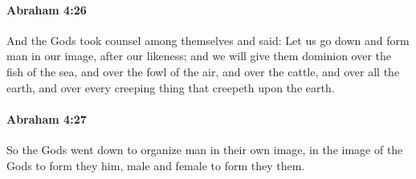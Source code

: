 
		\paragraph{Abraham 4:26} %
			\label{ABRAHAM-4-26}

			And the Gods took counsel among themselves and said: Let us go down and form man in our image, after our likeness; and we will give them dominion over the fish of the sea, and over the fowl of the air, and over the cattle, and over all the earth, and over every creeping thing that creepeth upon the earth.


		\paragraph{Abraham 4:27} %
			\label{ABRAHAM-4-27}

			So the Gods went down to organize man in their own image, in the image of the Gods to form they him, male and female to form they them.


